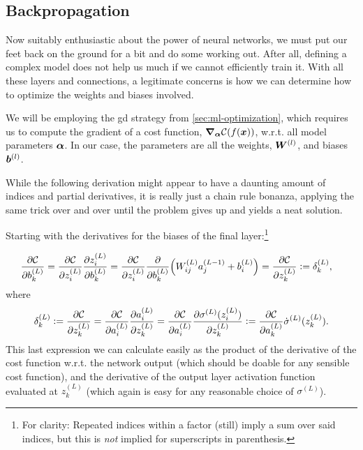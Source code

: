 \documentclass[Thesis.tex]{subfiles}
\begin{document}
\subsection{Backpropagation}
\label{sec:ml-backprop}

Now suitably enthusiastic about the power of neural networks, we must put our
feet back on the ground for a bit and do some working out. After all, defining a
complex model does not help us much if we cannot efficiently train it. With all
these layers and connections, a legitimate concerns is how we can determine how
to optimize the weights and biases involved.

We will be employing the \acrlong{gd} strategy from \cref{sec:ml-optimization},
which requires us to compute the gradient of a cost function,
$\grad_{\bm{\alpha}}\mathcal{C}(f(\bm{x}))$, w.r.t. all model parameters $\bm{\alpha}$. In
our case, the parameters are all the weights, $\bm{W}^{(l)}$, and biases $\bm{b}^{(l)}$.

While the following derivation might appear to have a daunting amount of indices
and partial derivatives, it is really just a chain rule bonanza, applying the
same trick over and over until the problem gives up and yields a neat
solution.

Starting with the derivatives for the biases of the final layer:\footnote{For
  clarity: Repeated indices within a factor (still) imply a sum over said
  indices, but this is \emph{not} implied for superscripts in parenthesis.}

\begin{align}
  \pdv{\mathcal{C}}{b_k^{(L)}} &=
\pdv{\mathcal{C}}{z_i^{(L)}}\pdv{z_i^{(L)}}{b_k^{(L)}}
=\pdv{\mathcal{C}}{z_i^{(L)}}\pdv{}{b_k^{(L)}}\qty(W_{ij}^{(L)}a_j^{(L-1)} +
b_i^{(L)}) = \pdv{\mathcal{C}}{z_k^{(L)}}\vcentcolon= \delta_k^{(L)},
\end{align}
where
\begin{align}
  \delta_k^{(L)}\vcentcolon= \pdv{\mathcal{C}}{z_k^{(L)}} =
\pdv{\mathcal{C}}{a^{(L)}_{i}}\pdv{a_i^{(L)}}{z_k^{(L)}} =
\pdv{\mathcal{C}}{a^{(L)}_{i}}\pdv{\sigma^{(L)}(z_i^{(L)})}{z_k^{(L)}} \vcentcolon=
\pdv{\mathcal{C}}{a^{(L)}_{k}}\dot\sigma^{(L)}(z_k^{(L)}).
\end{align}
This last expression we can calculate easily as the product of the derivative of
the cost function w.r.t. the network output (which should be doable for any
sensible cost function), and the derivative of the output layer activation
function evaluated at $z_k^{(L)}$ (which again is easy for any reasonable choice
of $\sigma^{(L)}$).
\end{document}
